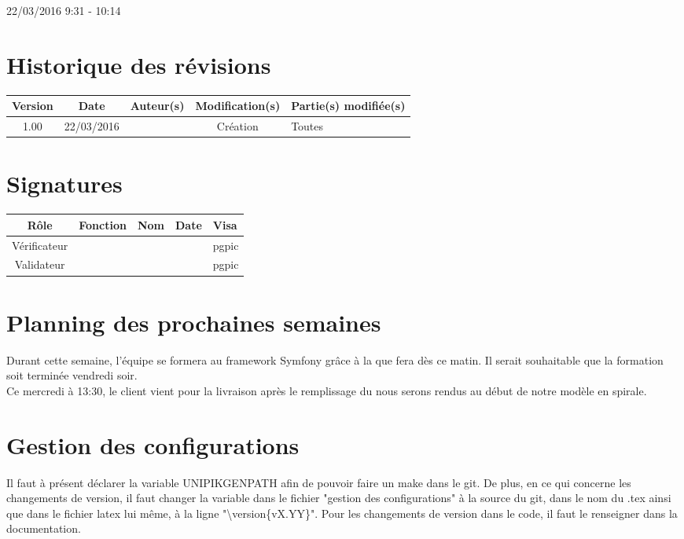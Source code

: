 \documentclass [a4paper] {article}
\begin{document}
22/03/2016			 				%
\hfill   
\hfill 	 9:31 - 10:14 				%



\section*{Historique des révisions}
\begin{center}
			\begin{tabular}{| c | c | c | c | p{4cm} |}
				\hline
				\rowcolor{Gray}
				Version & Date & Auteur(s) & Modification(s) & Partie(s) modifiée(s)		 \\
				\hline
				1.00 & 22/03/2016 & \Pierre & Création & Toutes \\
		\hline		
			\end{tabular}
		\end{center}

\section*{Signatures}

		\begin{center}
			\begin{tabular}{| c | c | c | c | p{4cm} |}
				\hline
				\rowcolor{Gray}
				Rôle & Fonction & Nom & Date & Visa		 \\
				\hline
				Vérificateur & \RQA & \Kafui &  & pgpic \\[30pt]
				\hline
				Validateur & \CP & \Sergi &  & pgpic \\[30pt]	
				\hline
			\end{tabular}
		\end{center}
		
\newpage		



\section{Planning des prochaines semaines}
Durant cette semaine, l'équipe se formera au framework Symfony grâce à la \FF{} que \Florian{} fera dès ce matin. Il serait souhaitable que la formation soit terminée vendredi soir. \\
Ce mercredi à 13:30, le client vient pour la livraison après le remplissage du \CDR{} nous serons rendus au début de notre modèle en spirale.


\section{Gestion des configurations}
Il faut à présent déclarer la variable UNIPIKGENPATH afin de pouvoir faire un make dans le git. De plus, en ce qui concerne les changements de version, il faut changer la variable dans le fichier "gestion des configurations" à la source du git, dans le nom du .tex ainsi que dans le fichier latex lui même, à la ligne "\textbackslash version\{vX.YY\}".
Pour les changements de version dans le code, il faut le renseigner dans la documentation.
\end{document}
